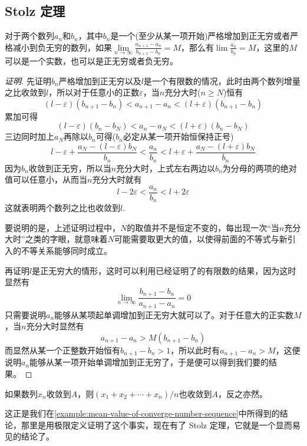 \subsection{Stolz 定理}
\label{sec:stolz-theorem}

\begin{theorem}[Stolz 定理]
  对于两个数列$a_n$和$b_n$，其中$b_n$是一个(至少从某一项开始)严格增加到正无穷或者严格减小到负无穷的数列，如果$\lim\limits_{n\to\infty}\frac{a_{n+1}-a_n}{b_{n+1}-b_n} = M$，那么有$\lim\limits \frac{a_n}{b_n} = M$，这里的$M$可以是一个实数，也可以是正无穷或者负无穷。
\end{theorem}

\begin{proof}[证明]
  先证明$b_n$严格增加到正无穷以及$l$是一个有限数的情况，此时由两个数列增量之比收敛到$l$，所以对于任意小的正数$\varepsilon$，当$n$充分大时($n \geqslant N$)恒有
  \[ (l-\varepsilon)(b_{n+1}-b_n) < a_{n+1}-a_n < (l+\varepsilon)(b_{n+1}-b_n) \]
  累加可得
  \[ (l-\varepsilon)(b_{n}-b_N) < a_{n}-a_N < (l+\varepsilon)(b_{n}-b_N) \]
  三边同时加上$a_N$再除以$b_n$可得($b_n$必定从某一项开始恒保持正号)
  \[ l-\varepsilon+\frac{a_N-(l-\varepsilon)b_N}{b_n} < \frac{a_n}{b_n} < l+\varepsilon+\frac{a_N-(l+\varepsilon)b_N}{b_n}\]
  因为$b_n$收敛到正无穷，所以当$n$充分大时，上式左右两边以$b_n$为分母的两项的绝对值可以任意小，从而当$n$充分大时就有
  \[ l-2\varepsilon < \frac{a_n}{b_n} < l + 2\varepsilon \]
  这就表明两个数列之比也收敛到$l$.

  要说明的是，上述证明过程中，$N$的取值并不是恒定不变的，每出现一次“当$n$充分大时”之类的字眼，就意味着$N$可能需要取更大的值，以使得前面的不等式与新引入的不等关系能够同时成立。

  再证明$l$是正无穷大的情形，这时可以利用已经证明了的有限数的结果，因为这时显然有
  \[ \lim_{n \to \infty} \frac{b_{n+1}-b_n}{a_{n+1}-a_n} = 0 \]
  只需要说明$a_n$能够从某项起单调增加到正无穷大就可以了。对于任意大的正实数$M$，当$n$充分大时显然有
  \[ a_{n+1}-a_n > M(b_{n+1}-b_n) \]
  而显然从某一个正整数开始恒有$b_{n+1}-b_n>1$，所以此时有$a_{n+1}-a_n>M$，这便说明$a_n$能够从某一项开始单调增加到正无穷了，于是便可以得到我们要的结果。
\end{proof}

\begin{inference}
  如果数列$x_n$收敛到$A$，则$(x_1+x_2+\cdots+x_n)/n$也收敛到$A$，反之亦然。
\end{inference}

这正是我们在\autoref{example:mean-value-of-converge-number-sequence}中所得到的结论，那里是用极限定义证明了这个事实，现在有了 Stolz 定理，它就是一个显而易见的结论了。

